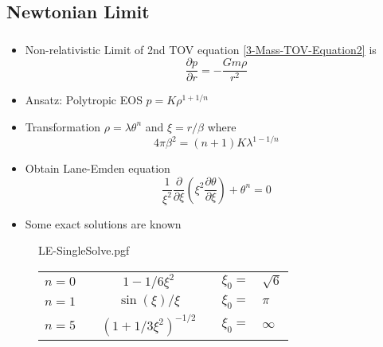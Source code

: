 \subsection{Newtonian Limit}
\begin{frame}
	\frametitle{\insertsubsection}
	\begin{itemize}[<+->]
		\item Non-relativistic Limit of 2nd TOV equation \ref{3-Mass-TOV-Equation2} is
		\begin{equation}\frac{
			\partial p}{\partial r}=-\frac{Gm\rho}{r^2}
		\end{equation}
		\item Ansatz: Polytropic EOS $p=K\rho^{1+1/n}$
		\item Transformation $\rho=\lambda\theta^n$ and $\xi=r/\beta$ where
		\begin{equation}
			4\pi\beta^2=(n+1)K\lambda^{1-1/n}
		\end{equation}
		\item Obtain Lane-Emden equation \cite{laneTheoreticalTemperatureSun1870} \cite{emdenGaskugeln1907}
		\begin{equation}
			\frac{1}{\xi^2}\frac{\partial}{\partial\xi}\left(\xi^2\frac{\partial\theta}{\partial\xi}\right)+\theta^n=0
		\end{equation}
		\item Some exact solutions are known \cite{chandrasekharChandrasekharAnIntroductionStudy1958}
	\end{itemize}
\end{frame}

\begin{frame}
	\begin{figure}
		\centering
		{LE-SingleSolve.pgf}
		\begin{tabular}[b]{@{}lcccrl@{}}
			\toprule
			$n=0$ && $\displaystyle 1-1/6\xi^2$ && $\xi_0=$&$\sqrt{6}$\\[1ex]
			$n=1$ && $\displaystyle \sin(\xi)/\xi$ && $\xi_0=$&$\pi$\\[1ex]
			$n=5$ && $\displaystyle \left(1+1/3\xi^2\right)^{-1/2}$ && $\xi_0=$&$\infty$\\[1ex]
			\bottomrule
		\end{tabular}
	\end{figure}
\end{frame}


